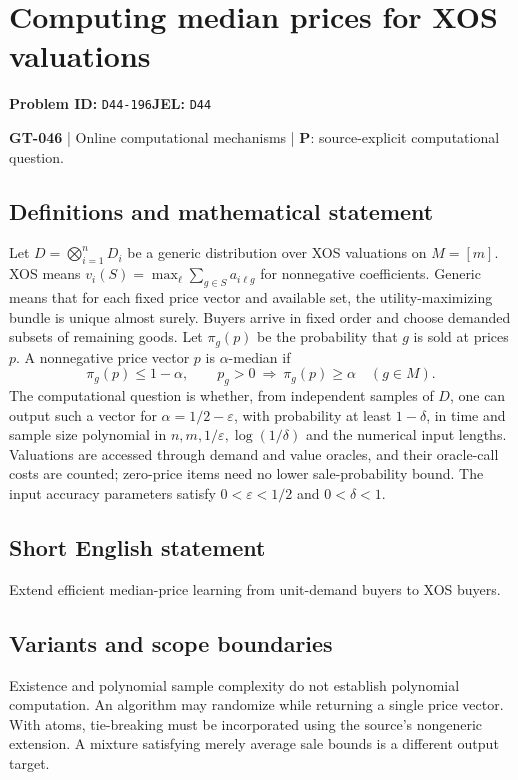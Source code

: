 \documentclass[11pt,a4paper]{article}
\begin{document}
\section*{Computing median prices for XOS valuations}
\textbf{Problem ID:} \texttt{D44-196}\quad \textbf{JEL:} \texttt{D44}\par
\label{problem:OP-0176}
\label{game:GT-046}
{\sffamily\small\color{muted}
\textbf{GT-046} | Online computational mechanisms | \textbf{P}: source-explicit computational question.
\par}
\subsection*{Definitions and mathematical statement}
Let $D=\bigotimes_{i=1}^nD_i$ be a generic distribution over XOS valuations on $M=[m]$. XOS means $v_i(S)=\max_{\ell}\sum_{g\in S}a_{i\ell g}$ for nonnegative coefficients. Generic means that for each fixed price vector and available set, the utility-maximizing bundle is unique almost surely. Buyers arrive in fixed order and choose demanded subsets of remaining goods. Let $\pi_g(p)$ be the probability that $g$ is sold at prices $p$. A nonnegative price vector $p$ is $\alpha$-median if
\[
 \pi_g(p)\leq1-\alpha,\qquad
 p_g>0\ \Longrightarrow\ \pi_g(p)\geq\alpha
 \quad(g\in M).
\]
The computational question is whether, from independent samples of $D$, one can output such a vector for $\alpha=1/2-\varepsilon$, with probability at least $1-\delta$, in time and sample size polynomial in $n,m,1/\varepsilon,\log(1/\delta)$ and the numerical input lengths. Valuations are accessed through demand and value oracles, and their oracle-call costs are counted; zero-price items need no lower sale-probability bound. The input accuracy parameters satisfy $0<\varepsilon<1/2$ and $0<\delta<1$.
\subsection*{Short English statement}
Extend efficient median-price learning from unit-demand buyers to XOS buyers.
\subsection*{Variants and scope boundaries}
Existence and polynomial sample complexity do not establish polynomial computation. An algorithm may randomize while returning a single price vector. With atoms, tie-breaking must be incorporated using the source's nongeneric extension. A mixture satisfying merely average sale bounds is a different output target.
\end{document}
